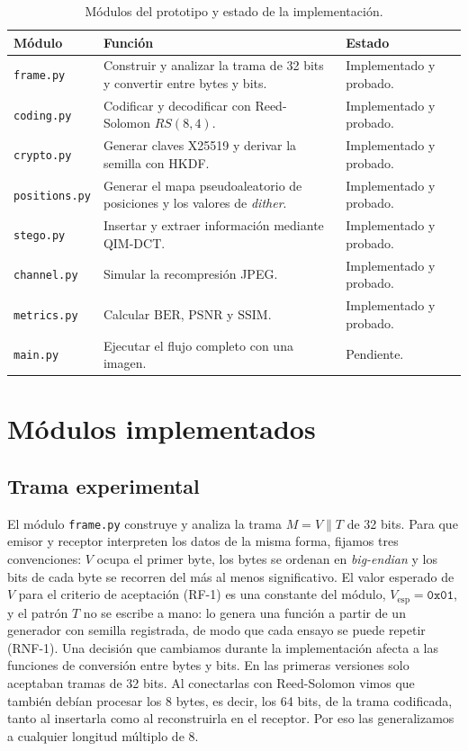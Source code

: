 \documentclass[IB]{TFUOC}%
\begin{document}
\begin{table}[H]
\centering
\scriptsize
\caption{Módulos del prototipo y estado de la implementación.}
\label{tab:modulos}
\begin{tabular}{|p{2.6cm}|p{7.8cm}|p{3.6cm}|}
\hline
\rowcolor{uocnavy}
\color{white}\textbf{Módulo} &
\color{white}\textbf{Función} &
\color{white}\textbf{Estado} \\
\hline
\texttt{frame.py} & Construir y analizar la trama de 32 bits y convertir entre bytes y bits. & Implementado y probado. \\
\hline
\texttt{coding.py} & Codificar y decodificar con Reed-Solomon $RS(8,4)$. & Implementado y probado. \\
\hline
\texttt{crypto.py} & Generar claves X25519 y derivar la semilla con HKDF. & Implementado y probado. \\
\hline
\texttt{positions.py} & Generar el mapa pseudoaleatorio de posiciones y los valores de \textit{dither}. & Implementado y probado. \\
\hline
\texttt{stego.py} & Insertar y extraer información mediante QIM-DCT. & Implementado y probado. \\
\hline
\texttt{channel.py} & Simular la recompresión JPEG. & Implementado y probado. \\
\hline
\texttt{metrics.py} & Calcular $\mathrm{BER}$, $\mathrm{PSNR}$ y $\mathrm{SSIM}$. & Implementado y probado. \\
\hline
\texttt{main.py} & Ejecutar el flujo completo con una imagen. & Pendiente. \\
\hline
\end{tabular}
\end{table}

\section{Módulos implementados}
\label{sec:modulos_implementados}

\subsection{Trama experimental}
\label{subsec:impl_frame}

El módulo \texttt{frame.py} construye y analiza la trama $M=V\parallel T$ de 32 bits. Para que emisor y 
receptor interpreten los datos de la misma forma, fijamos tres convenciones: $V$ ocupa el primer byte, los bytes se ordenan en \textit{big-endian} y los bits de cada byte se recorren del más al menos significativo. El valor esperado de $V$ para el criterio de aceptación (RF-1) es una constante del módulo, $V_{\mathrm{esp}}=\texttt{0x01}$, y el patrón $T$ no se escribe a mano: lo genera una función a partir de un generador con semilla registrada, de modo que cada ensayo se puede repetir (RNF-1).
Una decisión que cambiamos durante la implementación afecta a las funciones de conversión entre bytes y bits. 
En las primeras versiones solo aceptaban tramas de 32 bits. Al conectarlas con Reed-Solomon vimos que también debían procesar los 8 bytes, es decir, los 64 bits, de la trama codificada, tanto al insertarla como al reconstruirla en el receptor. Por eso las generalizamos a cualquier longitud múltiplo de 8.
\end{document}
